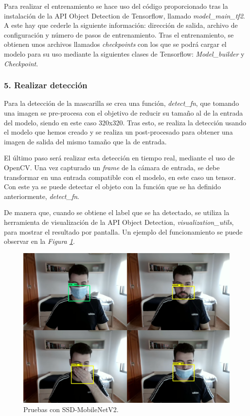 Para realizar el entrenamiento se hace uso del código proporcionado tras la instalación de la API Object Detection de Tensorflow, llamado \textit{model\_main\_tf2}. A este hay que cederle la siguiente información: dirección de salida, archivo de configuración y número de pasos de entrenamiento. Tras el entrenamiento, se obtienen unos archivos llamados \textit{checkpoints} con los que se podrá cargar el modelo para su uso mediante la siguientes clases de Tensorflow: \textit{Model\_builder} y \textit{Checkpoint}.

\vspace{-0.5cm}
\subsubsection*{5. Realizar detección}
\vspace{-0.7cm}
Para la detección de la mascarilla se crea una función, \textit{detect\_fn}, que tomando una imagen se pre-procesa con el objetivo de  reducir su tamaño al de la entrada del modelo, siendo en este caso 320x320. Tras esto, se realiza la detección usando el modelo que hemos creado y se realiza un post-procesado para obtener una imagen de salida del mismo tamaño que la de entrada.

El último paso será realizar esta detección en tiempo real, mediante el uso de OpenCV. Una vez capturado un \textit{frame} de la cámara de entrada, se debe transformar en una entrada compatible con el modelo, en este caso un tensor. Con este ya se puede detectar el objeto con la función que se ha definido anteriormente, \textit{detect\_fn}. 

De manera que, cuando se obtiene el label que se ha detectado, se utiliza la herramienta de visualización de la API Object Detection, \textit{visualization\_utils}, para mostrar el resultado por pantalla. Un ejemplo del funcionamiento se puede observar en la \textit{Figura \ref{fig:protoTensorFlow}}.

\begin{figure}[htp]
	\centering
	\includegraphics[width=12cm]{imagenes/tf_prueba.png}
	\caption{Pruebas con SSD-MobileNetV2.}
	\label{fig:protoTensorFlow}
\end{figure}

